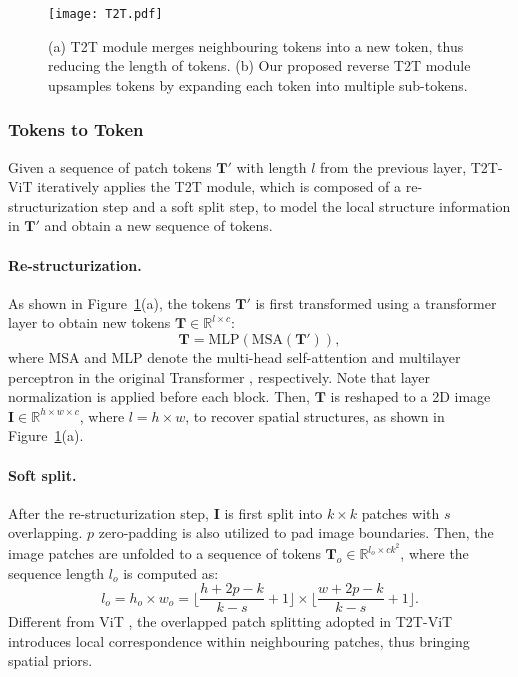 \documentclass[10pt,twocolumn,letterpaper]{article}
\begin{document}
\begin{figure*}[!t]
  \graphicspath{{Figures/Network/}}
  \centering
  \texttt{[image: T2T.pdf]}
  \caption{(a) T2T module merges neighbouring tokens into a new token, thus reducing the length of tokens. (b) Our proposed reverse T2T module upsamples tokens by expanding each token into multiple sub-tokens.}
  \label{T2T}
  \vspace{-0.3cm}
\end{figure*}


\vspace{-3mm}
\subsubsection{Tokens to Token}
Given a sequence of patch tokens $\bm{T}'$ with length $l$ from the previous layer, T2T-ViT iteratively applies the T2T module, which is composed of a re-structurization step and a soft split step, to model the local structure information in $\bm{T}'$ and obtain a new sequence of tokens.

\vspace{-3mm}
\paragraph{Re-structurization.}
As shown in Figure~\ref{T2T}(a), the tokens $\bm{T}'$ is first transformed using a transformer layer to obtain new tokens $\bm{T} \in {\mathbb{R}^{l\times c}}$:
\begin{equation} \label{reconstruction}
\bm{T} = \text{MLP}(\text{MSA}(\bm{T}')),
\end{equation}
where MSA and MLP denote the multi-head self-attention and multilayer perceptron in the original Transformer \cite{vaswani2017attention}, respectively. Note that layer normalization \cite{ba2016layer} is applied before each block.
Then, $\bm{T}$ is reshaped to a 2D image $\bm{I}\in{\mathbb{R}^{h\times{w\times c}}}$, where $l=h\times w$, to recover spatial structures, as shown in Figure~\ref{T2T}(a).

\vspace{-3mm}
\paragraph{Soft split.}
After the re-structurization step, $\bm{I}$ is first split into $k \times k$ patches with $s$ overlapping. $p$ zero-padding is also utilized to pad image boundaries. Then, the image patches are unfolded to a sequence of tokens $\bm{T}_o \in {\mathbb{R}^{l_o\times ck^2}}$, where the sequence length $l_o$ is computed as:
\begin{equation} \label{softsplit}
l_o =h_o\times w_o=\lfloor \frac{h+2p-k}{k-s}+1\rfloor \times \lfloor \frac{w+2p-k}{k-s}+1\rfloor.
\end{equation}
Different from ViT \cite{dosovitskiy2020image}, the overlapped patch splitting adopted in T2T-ViT introduces local correspondence within neighbouring patches, thus bringing spatial priors.
\end{document}
